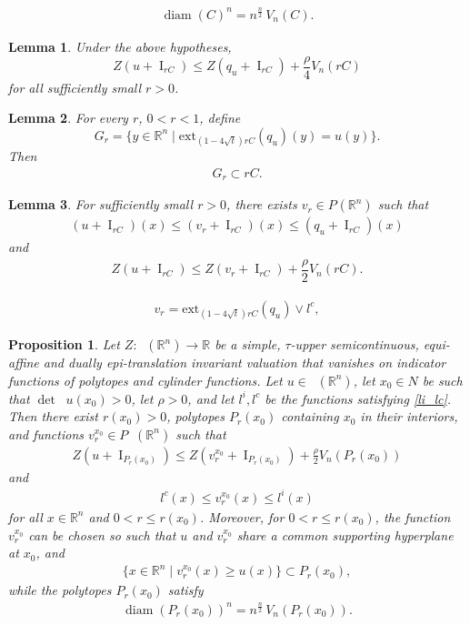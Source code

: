 \documentclass[10pt,a4paper]{amsart}
\newtheorem{prop}{Proposition}
\newtheorem{lema}{Lemma}
\DeclareMathOperator{\D}{D^2}
\DeclareMathOperator{\I}{I}
\DeclareMathOperator{\LP}{Conv_{lp}}
\DeclareMathOperator{\LQ}{_{l.q}}
\newcommand{\RR}{(\mathbb{R}^n)}
\DeclareMathOperator{\diam}{diam}
\begin{document}
\begin{align}\label{eq10.26.}
   \diam(C)^n= n^{\frac{n}{2}}\, V_n(C).
\end{align}

\begin{lema}\label{lema10.1}
Under the above hypotheses,
$$Z(u + \I_{rC})\leq Z(q_u+\I_{rC})+\frac{\rho}{4}V_n(rC)$$
for all sufficiently small $r > 0$.
\end{lema}

\begin{lema}\label{claim2}
For every $r$, $0 < r < 1$, define
$$
G_r = \{ y \in \mathbb{R}^n \mid \mathrm{ext}_{(1-4\sqrt{t}) rC}(q_u)(y) = u (y) \}.
$$
Then
\begin{align*}
G_r \subset rC.
\end{align*}    
\end{lema}

\begin{lema}\label{lema*}
For sufficiently small $r>0$, there exists  $v_r\in P_{\LQ}\RR$ such that
\begin{align*}
 (u + \I_{rC})(x)\leq (v_r+\I_{rC})(x) \leq  (q_u+\I_{rC})(x) 
\end{align*}
and 
\begin{align}\label{eq10.39}
    Z(u + \I_{rC})\leq Z(v_r+\I_{rC})+\dfrac{\rho}{2}V_n(rC).
\end{align}
\end{lema}

\begin{align}\label{eq10.42}
v_r = \mathrm{ext}_{(1-4\sqrt{t}) rC}(q_u) \vee  l^c, 
\end{align}

\begin{prop}\label{regularr}
Let $Z:\LP\RR\rightarrow\mathbb{R}$ be a simple, $\tau$-upper semicontinuous, equi-affine and  dually epi-translation   invariant valuation that   vanishes on  indicator functions of polytopes and cylinder functions. Let $u \in \LP(\mathbb{R}^n)$,
let $x_0\in N$ be such that $\det\D u(x_0)>0$,  let $\rho>0$, and let $l^i, l^c$  be the functions satisfying \eqref{li_lc}. Then there exist $r(x_0)>0$, 
polytopes $P_r(x_0)$ containing $x_0$ in their interiors, and  functions $v_r^{x_0}\in P\LQ\RR$ such that
\begin{align}\label{eq10.47a}
  Z(u+\I_{P_r(x_0)}) \leq Z(v_r^{x_0}+\I_{P_r(x_0)}) + \frac{\rho}{2}V_n(P_r(x_0))
\end{align}
and
\begin{align}\label{eq10.48b}
l^c(x)\leq v_r^{x_0}(x)\leq l^i(x)    
\end{align}
for all $x\in \mathbb{R}^n$ and $0<r\leq r(x_0)$. Moreover, for $0<r\leq r(x_0)$,  the function $v_r^{x_0}$ can be chosen so such that
$u$ and $v_r^{x_0}$ share a common supporting hyperplane at $x_0$, and 
\begin{align}\label{eq4111c}
 \{x\in \mathbb{R}^n\mid v_r^{x_0}(x)\geq u(x)\}   \subset P_r(x_0), 
\end{align}
while the  polytopes $P_r(x_0)$ satisfy 
\begin{align}\label{eq10.26..d}
\diam(P_r(x_0))^n= n^{\frac{n}{2}}\, V_n(P_r(x_0)).    
\end{align}
\end{prop}
\end{document}

